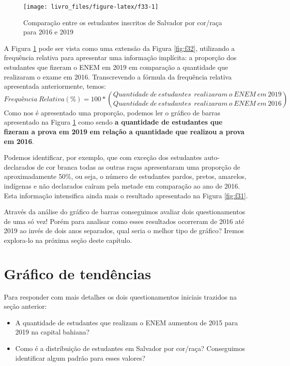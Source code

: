 \documentclass[
  oneside]{book}
\begin{document}
\begin{figure}

{\centering \texttt{[image: livro\_files/figure-latex/f33-1]} 

}

\caption{Comparação entre os estudantes inscritos de Salvador por cor/raça para 2016 e 2019}\label{fig:f33}
\end{figure}

A Figura \ref{fig:f33} pode ser vista como uma extensão da Figura \ref{fig:f32}, utilizando a frequência relativa para apresentar uma informação implícita: a proporção dos estudantes que fizeram o ENEM em 2019 em comparação a quantidade que realizaram o exame em 2016. Transcrevendo a fórmula da frequência relativa apresentada anteriormente, temos:
\[Frequência\ Relativa (\%) = 100*{Quantidade\ de\ estudantes\ \ realizaram\ o\ ENEM\ em\ 2019\choose Quantidade\ de\ estudantes\ \ realizaram\ o\ ENEM\ em\ 2016}\]
Como nos é apresentado uma proporção, podemos ler o gráfico de barras apresentado na Figura \ref{fig:f33} como sendo \textbf{a quantidade de estudantes que fizeram a prova em 2019 em relação a quantidade que realizou a prova em 2016}.

Podemos identificar, por exemplo, que com exceção dos estudantes auto-declarados de cor branca todas as outras raças apresentaram uma proporção de aproximadamente 50\%, ou seja, o número de estudantes pardos, pretos, amarelos, indígenas e não declarados caíram pela metade em comparação ao ano de 2016. Esta informação intensifica ainda mais o resultado apresentado na Figura \ref{fig:f31}.

Através da análise do gráfico de barras conseguimos avaliar dois questionamentos de uma só vez! Porém para analisar como esses resultados ocorreram de 2016 até 2019 ao invés de dois anos separados, qual seria o melhor tipo de gráfico? Iremos explora-lo na próxima seção deste capítulo.

\hypertarget{gtend}{%
\section{Gráfico de tendências}\label{gtend}}

Para responder com mais detalhes os dois questionamentos iniciais trazidos na seção anterior:

\begin{itemize}
\item
  A quantidade de estudantes que realizam o ENEM aumentou de 2015 para 2019 na capital bahiana?
\item
  Como é a distribuição de estudantes em Salvador por cor/raça? Conseguimos identificar algum padrão para esses valores?
\end{itemize}
\end{document}
